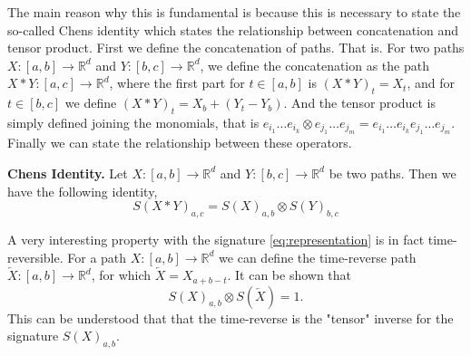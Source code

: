 The main reason why this is fundamental is because this is necessary to state the so-called Chens identity which states the relationship between concatenation and tensor product. First we define the concatenation of paths. That is. For two paths $X: \left[ a,b \right] \to \mathbb{R} ^{d}$  and $Y : \left[ b,c \right]
\to  \mathbb{R} ^{d}$, we define the concatenation as the path $X * Y : \left[ a,c \right]  \to \mathbb{R} ^{d}$, where the first part for $t \in  \left[ a,b \right] $ is $( X* Y) _{t} = X_{t}$, and for $t \in  \left[ b,c \right] $ we define $( X*Y)
_{t} = X_{b} + ( Y_{t} - Y_{b}) $. And the tensor product is simply defined joining the monomials, that is  $e_{i_{1}} \ldots e_{i_{k}} \otimes e_{j_{1}} \ldots e_{j_{m}}  = e_{i_{1}} \ldots e_{i_{k}}  e_{j_{1}} \ldots e_{j_{m}}$. Finally we can
state the relationship between these operators.

\begin{theorem}
    \textbf{Chens Identity.} Let $X: \left[ a,b \right] \to  \mathbb{R} ^{d}$ and $Y: \left[ b,c \right] \to \mathbb{R} ^{d}$ be two paths. Then we have the following identity,
    \begin{equation}
        S( X*Y) _{a,c} = S( X) _{a,b} \otimes  S( Y) _{b,c}
    \end{equation}

\end{theorem}


A very interesting property with the signature \eqref{eq:representation} is in fact time-reversible. For a path $X: \left[ a,b \right]  \to \mathbb{R} ^{d}$ we can define the time-reverse path $\overleftarrow{X}: \left[ a,b \right]  \to  \mathbb{R} ^{d} $, for
which $ \overleftarrow{X}  = X_{a+b -t}$. It can be shown that \begin{equation}
    S( X) _{a,b} \otimes S( \overleftarrow{X}) = 1.
\end{equation}
This can be understood that that the time-reverse is the "tensor" inverse for the signature $S( X) _{a,b}$.



